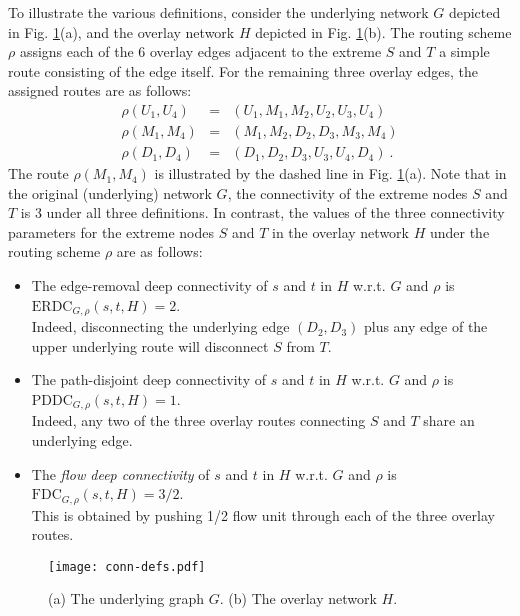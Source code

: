 \LongVersion \documentclass[11pt]{article}
\theoremstyle{definition}
\theoremstyle{plain}
\newcommand{\ERDC}[0]{\mathrm{ERDC}}
\newcommand{\PDDC}[0]{\mathrm{PDDC}}
\newcommand{\FDC}[0]{\mathrm{FDC}}
\begin{document}
\par
{}
To illustrate the various definitions,
consider the underlying network $G$ depicted in Fig. \ref{fig:conn-defs}(a),
and the overlay network $H$ depicted in Fig. \ref{fig:conn-defs}(b).
The routing scheme $\rho$ assigns each of the 6 overlay edges adjacent to
the extreme $S$ and $T$ a simple route consisting of the edge itself.
For the remaining three overlay edges, the assigned routes are as follows:
\begin{eqnarray*}
\rho(U_1,U_4) & = & (U_1,M_1,M_2,U_2,U_3,U_4)\\
\rho(M_1,M_4) & = & (M_1,M_2,D_2,D_3,M_3,M_4)\\
\rho(D_1,D_4) & = & (D_1,D_2,D_3,U_3,U_4,D_4)~.
\end{eqnarray*}
The route $\rho(M_1,M_4)$ is illustrated by the dashed line in
Fig. \ref{fig:conn-defs}(a).
Note that in the original (underlying) network $G$, the connectivity of the
extreme nodes $S$ and $T$ is 3 under all three definitions. In contrast,
the values of the three connectivity parameters for the extreme nodes
$S$ and $T$ in the overlay network $H$ under the routing scheme $\rho$
are as follows:

\begin{itemize}
\item
The edge-removal deep connectivity of $s$ and $t$ in $H$
w.r.t. $G$ and $\rho$ is $\ERDC_{G, \rho}(s, t, H)=2$.
\\
Indeed, disconnecting the underlying edge $(D_2,D_3)$
plus any edge of the upper underlying route will disconnect $S$ from $T$.
\item
The path-disjoint deep connectivity of $s$ and $t$ in $H$
w.r.t. $G$ and $\rho$ is $\PDDC_{G, \rho}(s, t, H)=1$.
\\
Indeed, any two of the three overlay routes connecting $S$ and $T$
share an underlying edge.
\item
The \emph{flow deep connectivity} of $s$ and $t$ in $H$
w.r.t. $G$ and $\rho$ is $\FDC_{G, \rho}(s, t, H) = 3/2$.
\\
This is obtained by pushing 1/2 flow unit through each of the three
overlay routes.
\end{itemize}

\begin{figure}
\begin{center}
\texttt{[image: conn-defs.pdf]}
\end{center}
\caption{\label{fig:conn-defs}
(a) The underlying graph $G$.
(b) The overlay network $H$.}
\vspace*{-.5cm}
\end{figure}
\end{document}
